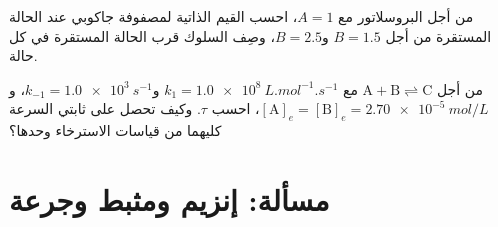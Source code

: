 \begin{exercise}[$\star\star\star$]\label{exo:b3:complex-kinetics:11}
من أجل البروسلاتور مع $A = 1$، احسب القيم الذاتية لمصفوفة جاكوبي عند
الحالة المستقرة من أجل $B = 1.5$ و$B = 2.5$، وصِف السلوك قرب
الحالة المستقرة في كل حالة.
\end{exercise}

\begin{exercise}[$\star\star\star$]\label{exo:b3:complex-kinetics:12}
من أجل $\mathrm{A + B \rightleftharpoons C}$ مع $k_1 = \qty{1.0e8}{L.mol^{-1}.s^{-1}}$ و$k_{-1} = \qty{1.0e3}{s^{-1}}$، 
و$[\mathrm A]_e = [\mathrm B]_e = \qty{2.70e-5}{mol/L}$، احسب $\tau$. وكيف تحصل على ثابتي السرعة كليهما
من قياسات الاسترخاء وحدها؟
\end{exercise}

\section{مسألة: إنزيم ومثبط وجرعة}

